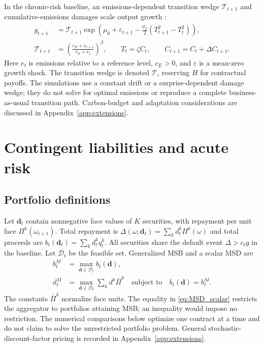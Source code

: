\documentclass[11pt]{article}
\begin{document}
In the chronic-risk baseline, an emissions-dependent transition wedge $\mathcal T_{t+1}$ and cumulative-emissions damages scale output growth \parencite{Seghini2026,DietzVenmans2019}:
\begin{align}
 g_{t+1}&=\mathcal T_{t+1}\exp\!\left(\mu_0+\varepsilon_{t+1}-\frac{\rho_T}{2}(T_{t+1}^2-T_t^2)\right),\label{eq:chronic}\\
 \mathcal T_{t+1}&=\left(\frac{c_E+e_{t+1}}{c_E+e_t}\right)^\beta,
 \qquad T_t=\zeta C_t,\qquad C_{t+1}=C_t+\Delta C_{t+1}.\nonumber
\end{align}
Here $e_t$ is emissions relative to a reference level, $c_E>0$, and $\varepsilon$ is a mean-zero growth shock. The transition wedge is denoted $\mathcal T$, reserving $H$ for contractual payoffs. The simulations use a constant drift or a surprise-dependent damage wedge; they do not solve for optimal emissions or reproduce a complete business-as-usual transition path. Carbon-budget and adaptation considerations are discussed in Appendix~\ref{app:extensions}.



\section{Contingent liabilities and acute risk}\label{sec:contracts}
\subsection{Portfolio definitions}
Let $\bm d_t$ contain nonnegative face values of $K$ securities, with repayment per unit face $\Pi^k(\omega_{t+1})$. Total repayment is $\Delta(\omega;\bm d_t)=\sum_k d_t^k\Pi^k(\omega)$ and total proceeds are $b_t(\bm d_t)=\sum_kd_t^kq_t^k$. All securities share the default event $\Delta>c_tg$ in the baseline. Let $\mathcal D_t$ be the feasible set. Generalized MSB and a scalar MSD are
\begin{align}
 b_t^M&=\max_{\bm d\in\mathcal D_t}b_t(\bm d),\label{eq:MSB_general}\\
 d_t^M&=\max_{\bm d\in\mathcal D_t}\sum_kd^k\bar\Pi^k
 \quad\text{subject to}\quad b_t(\bm d)=b_t^M.\label{eq:MSD_scalar}
\end{align}
The constants $\bar\Pi^k$ normalize face units. The equality in \eqref{eq:MSD_scalar} restricts the aggregator to portfolios attaining MSB; an inequality would impose no restriction. The numerical comparisons below optimize one contract at a time and do not claim to solve the unrestricted portfolio problem. General stochastic-discount-factor pricing is recorded in Appendix~\ref{app:extensions}.
\end{document}
